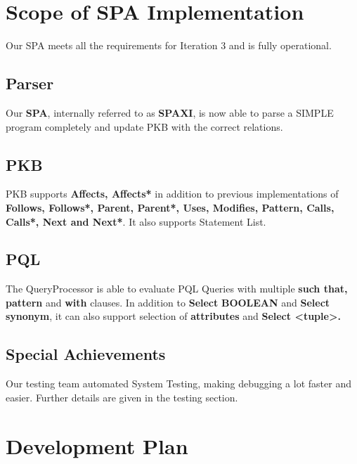 \documentclass[12pt]{article}
\begin{document}

\tableofcontents
\newpage
\singlespacing
\section{Scope of SPA Implementation}
Our SPA meets all the requirements for Iteration 3 and is fully operational.
\subsection{Parser}
Our \textbf{SPA}, internally referred to as \textbf{SPAXI}, is now able to parse a SIMPLE program completely and update PKB with the correct relations.
\subsection{PKB}
PKB supports \textbf{Affects, Affects*} in addition to previous implementations of \textbf{Follows, Follows*, Parent, Parent*, Uses, Modifies, Pattern, Calls, Calls*, Next and Next*}. It also supports Statement List.
\subsection{PQL}
The QueryProcessor is able to evaluate PQL Queries with multiple \textbf{such that, pattern} and \textbf{with} clauses. In addition to \textbf{Select} \textbf{BOOLEAN} and \textbf{Select synonym}, it can also support selection of \textbf{attributes} and \textbf{Select <tuple>.}
\subsection{Special Achievements}
Our testing team automated System Testing, making debugging a lot faster and easier. Further details are given in the testing section.
\section{Development Plan}
\end{document}
